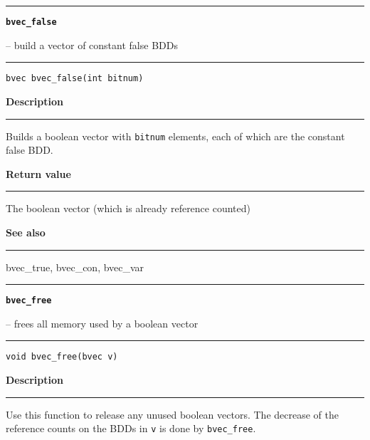 \begin{minipage}{\textwidth}

\noindent\begin{minipage}{\textwidth}
\rule{\textwidth}{0.5mm}
{\tt\bf bvec\_false }
\--- build a vector of constant false BDDs  \hspace{\fill}
\\\rule[1.5ex]{\textwidth}{0.5mm}
\end{minipage}

\noindent\begin{verbatim}
bvec bvec_false(int bitnum) 
\end{verbatim}

\vspace{\parsep}\noindent
{\bf Description}\\\rule[1.5ex]{\textwidth}{0.2mm}\vspace{-1.5ex}\setlength{\parindent}{1em}
Builds a boolean vector with {\tt bitnum} elements, each of which
           are the constant false BDD. 

\setlength{\parindent}{0em}\vspace{\parsep}\vspace{\baselineskip}\noindent
{\bf Return value}\\\rule[1.5ex]{\textwidth}{0.2mm}\vspace{-1.5ex}
The boolean vector (which is already reference counted) 

\vspace{\parsep}\vspace{\baselineskip}\noindent
{\bf See also}\\\rule[1.5ex]{\textwidth}{0.2mm}\vspace{-1.5ex}
bvec\_true, bvec\_con, bvec\_var 
\end{minipage}
\vspace{8ex}
\begin{minipage}{\textwidth}

\noindent\begin{minipage}{\textwidth}
\rule{\textwidth}{0.5mm}
{\tt\bf bvec\_free }
\--- frees all memory used by a boolean vector  \hspace{\fill}
\\\rule[1.5ex]{\textwidth}{0.5mm}
\end{minipage}

\noindent\begin{verbatim}
void bvec_free(bvec v) 
\end{verbatim}

\vspace{\parsep}\noindent
{\bf Description}\\\rule[1.5ex]{\textwidth}{0.2mm}\vspace{-1.5ex}\setlength{\parindent}{1em}
Use this function to release any unused boolean vectors. The
           decrease of the reference counts on the BDDs in {\tt v} is done
	   by {\tt bvec\_free}. 
\end{minipage}
